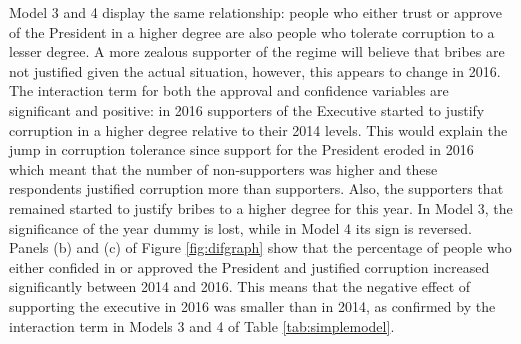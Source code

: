 \documentclass[floatsintext,man]{apa7}\usepackage[]{graphicx}\usepackage[]{color}
\begin{document}
Model 3 and 4 display the same relationship: people who either trust or approve of the President in a higher degree are also people who tolerate corruption to a lesser degree. A more zealous supporter of the regime will believe that bribes are not justified given the actual situation, however, this appears to change in 2016. The interaction term for both the approval and confidence variables are significant and positive: in 2016 supporters of the Executive started to justify corruption in a higher degree relative to their 2014 levels. This would explain the jump in corruption tolerance since support for the President eroded in 2016 which meant that the number of non-supporters was higher and these respondents justified corruption more than supporters. Also, the supporters that remained started to justify bribes to a higher degree for this year. In Model 3, the significance of the year dummy is lost, while in Model 4 its sign is reversed. Panels (b) and (c) of Figure \ref{fig:difgraph} show that the percentage of people who either confided in or approved the President and justified corruption increased significantly  between 2014 and 2016. This means that the negative effect of supporting the executive in 2016 was smaller than in 2014, as confirmed by the interaction term in Models 3 and 4 of Table \ref{tab:simplemodel}. 
\end{document}
